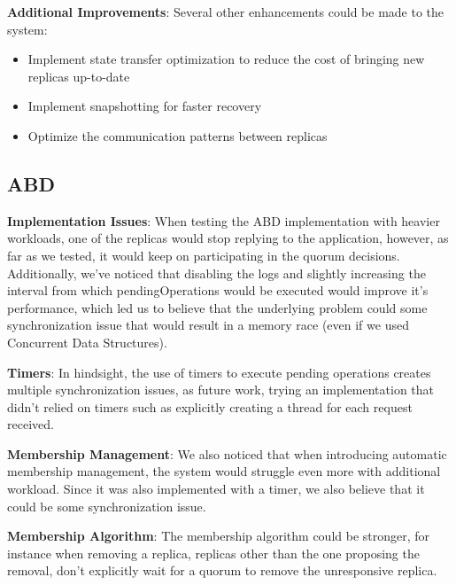 \documentclass[10pt,a4paper,twocolumn]{article}
\begin{document}
\par \textbf{Additional Improvements}: Several other enhancements could be made to the system:
\begin{itemize}
  	\setlength\itemsep{0em}
	\item Implement state transfer optimization to reduce the cost of bringing new replicas up-to-date
	\item Implement snapshotting for faster recovery
	\item Optimize the communication patterns between replicas
\end{itemize}
\subsection{ABD}
\label{sec:abdlimitfuture}
\textbf{Implementation Issues}: When testing the ABD implementation with heavier workloads, one of the replicas would stop replying to the application, however, as far as we tested, it would keep on participating in the quorum decisions. Additionally, we've noticed that disabling the logs and slightly increasing the interval from which pendingOperations would be executed would improve it's performance, which led us to believe that the underlying problem could some synchronization issue that would result in a memory race (even if we used Concurrent Data Structures).
\par \textbf{Timers}: In hindsight, the use of timers to execute pending operations creates multiple synchronization issues, as future work, trying an implementation that didn't relied on timers such as explicitly creating a thread for each request received.
\par \textbf{Membership Management}: We also noticed that when introducing automatic membership management, the system would struggle even more with additional workload. Since it was also implemented with a timer, we also believe that it could be some synchronization issue.
\par \textbf{Membership Algorithm}: The membership algorithm could be stronger, for instance when removing a replica, replicas other than the one proposing the removal, don't explicitly wait for a quorum to remove the unresponsive replica.
\end{document}
